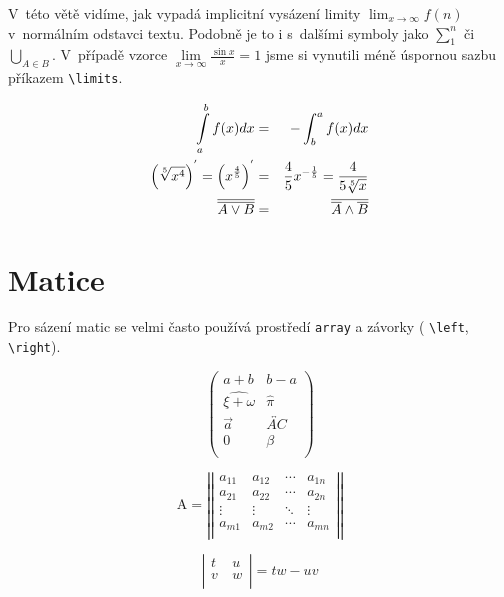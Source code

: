 \documentclass[11pt,a4paper,twocolumn]{article}
\begin{document}
	V~této větě vidíme, jak vypadá implicitní vysázení limity $\lim_{x\to\infty} f(n)$ v~normálním odstavci textu. Podobně je to i s~dalšími symboly jako $\sum_{1}^{n}$  či $\bigcup_{A \in B}$. V~případě vzorce $\lim\limits_{x\to\infty} \frac{\sin x}{x} = 1$ jsme si vynutili méně úspornou sazbu příkazem \verb|\limits|.
	
	\begin{eqnarray}
		\Large
		\int\limits_{a}^{b} f(x) dx & = & - \int_{b}^{a} f(x) dx \\	
		\Big(\sqrt[5]{x^4}\Big)^{'} = \Big(x^{\frac{4}{5}}\Big)^{'} & = & \frac{4}{5}x^{-\frac{1}{5}} = \frac{4}{5\sqrt[5]{x}} \\
		\overline{\overline{A \vee B}} & = & \overline{\overline{A} \wedge \overline{B}}
	\end{eqnarray}
	
	\normalsize
	
	\section{Matice}

	Pro sázení matic se velmi často používá prostředí \texttt{array} a závorky ( \verb|\left|,  \verb|\right|).
	
	
	
	$$
	\left( \begin{array}{cc}
	a + b & b - a \\
	\widehat{\xi + \omega}		& \widehat{\pi}	\\
	\overrightarrow{a} 	& \overleftrightarrow{AC} \\ %
	0 							& \beta \\
	\end{array} \right)$$
	
	$$\text{A} =\left|\left| \begin{array}{cccc}
	a_{11} & a_{12} & \cdots & a_{1n} \\
	a_{21} & a_{22}	& \cdots & a_{2n} \\
	\vdots & \vdots & \ddots & \vdots \\
	a_{m1} & a_{m2} & \cdots & a_{mn} \\
	\end{array} \right|\right| $$
	
	$$\left|\begin{array}{cc}
	t & u~\\
	v~& w \\
	\end{array} \right| = tw - uv$$
	
\end{document}
